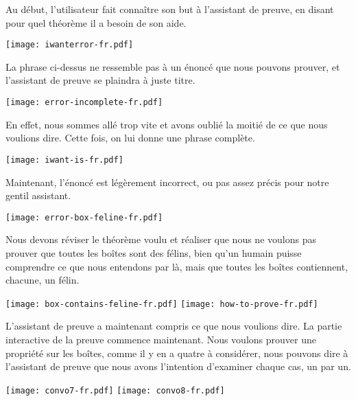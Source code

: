 Au début, l'utilisateur fait connaître son but à l'assistant de preuve, en
disant pour quel théorème il a besoin de son aide.

\begin{center}
  \texttt{[image: iwanterror-fr.pdf]}
\end{center}

La phrase ci-dessus ne ressemble pas à un énoncé que nous pouvons prouver, et
l'assistant de preuve se plaindra à juste titre.

\begin{center}
  \texttt{[image: error-incomplete-fr.pdf]}
\end{center}

En effet, nous sommes allé trop vite et avons oublié la moitié de ce que nous voulions dire. Cette fois, on lui donne une phrase complète.

\begin{center}
  \texttt{[image: iwant-is-fr.pdf]}
\end{center}

Maintenant, l'énoncé est légèrement incorrect, ou pas assez précis pour notre
gentil assistant.

\begin{center}
  \texttt{[image: error-box-feline-fr.pdf]}
\end{center}

Nous devons réviser le théorème voulu et réaliser que nous ne voulons pas
prouver que toutes les boîtes sont des félins, bien qu'un humain puisse
comprendre ce que nous entendons par là, mais que toutes les boîtes
contiennent, chacune, un félin.

\begin{center}
  \texttt{[image: box-contains-feline-fr.pdf]}
  \texttt{[image: how-to-prove-fr.pdf]}
\end{center}

L'assistant de preuve a maintenant compris ce que nous voulions dire. La partie
interactive de la preuve commence maintenant. Nous voulons prouver une propriété
sur les boîtes, comme il y en a quatre à considérer, nous pouvons dire à
l'assistant de preuve que nous avons l'intention d'examiner chaque cas, un par
un.

\begin{center}
  \texttt{[image: convo7-fr.pdf]}
  \texttt{[image: convo8-fr.pdf]}
\end{center}

